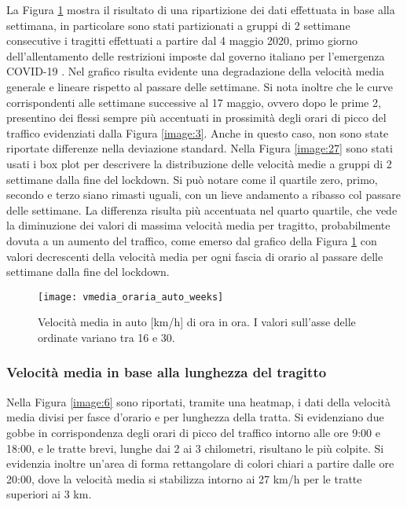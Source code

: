 La Figura \ref{image:5} mostra il risultato di una ripartizione dei dati effettuata in base alla settimana, in particolare sono stati partizionati a gruppi di 2 settimane consecutive i tragitti effettuati a partire dal 4 maggio 2020, primo giorno dell'allentamento delle restrizioni imposte dal governo italiano per l'emergenza COVID-19 \cite{misuredelgovernopercovid}. Nel grafico risulta evidente una degradazione della velocità media generale e lineare rispetto al passare delle settimane. Si nota inoltre che le curve corrispondenti alle settimane successive al 17 maggio, ovvero dopo le prime 2, presentino dei flessi sempre più accentuati in prossimità degli orari di picco del traffico evidenziati dalla Figura \ref{image:3}. Anche in questo caso, non sono state riportate differenze nella deviazione standard. Nella Figura \ref{image:27} sono stati usati i box plot per descrivere la distribuzione delle velocità medie a gruppi di 2 settimane dalla fine del lockdown. Si può notare come il quartile zero, primo, secondo e terzo siano rimasti uguali, con un lieve andamento a ribasso col passare delle settimane. La differenza risulta più accentuata nel quarto quartile, che vede la diminuzione dei valori di massima velocità media per tragitto, probabilmente dovuta a un aumento del traffico, come emerso dal grafico della Figura \ref{image:5} con valori decrescenti della velocità media per ogni fascia di orario al passare delle settimane dalla fine del lockdown.

\begin{figure}[H]
	\centering
	\texttt{[image: vmedia\_oraria\_auto\_weeks]}
	\caption{Velocità media in auto [km/h] di ora in ora. I valori sull'asse delle ordinate variano tra 16 e 30.}
	\label{image:5}
\end{figure}

\subsubsection{Velocità media in base alla lunghezza del tragitto}

Nella Figura \ref{image:6} sono riportati, tramite una heatmap, i dati della velocità media divisi per fasce d'orario e per lunghezza della tratta. Si evidenziano due gobbe in corrispondenza degli orari di picco del traffico intorno alle ore 9:00 e 18:00, e le tratte brevi, lunghe dai 2 ai 3 chilometri, risultano le più colpite. Si evidenzia inoltre un'area di forma rettangolare di colori chiari a partire dalle ore 20:00, dove la velocità media si stabilizza intorno ai 27 km/h per le tratte superiori ai 3 km.

